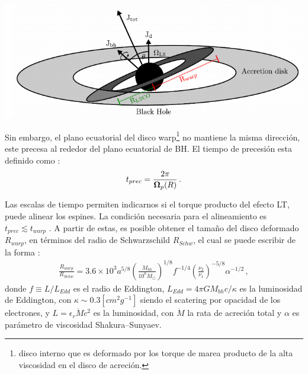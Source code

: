 %
\begin{center}
\includegraphics[scale=.4]{./figures/4_Modelo_Spin/Sistema_con_region_warp.png}
\label{fig: sistema con zona warp}
\end{center}
%
Sin embargo, el plano ecuatorial del disco warp\footnote{disco interno que es deformado por los torque de marea producto de la alta viscosidad en el disco de acreción.} no mantiene la misma dirección, este precesa al rededor del plano ecuatorial de BH. El tiempo de precesión esta definido como \cite{fanidakis2011}:
%
\begin{align}
    t_{prec}= \frac{2\pi}{{\bf{\Omega}}_p(R)}\,.
\end{align}

Las escalas de tiempo permiten indicarnos si el torque producto del efecto LT, puede alinear los espines. La condición necesaria para el alineamiento es $t_{prec}\lesssim t_{warp}$ \cite{natarajan1999}. A partir de estas, es posible obtener el tamaño del disco deformado $R_{warp}$, en términos del radio de Schwarzschild $R_{Schw}$, el cual se puede escribir de la forma \cite{volonteri2007}:
%
\begin{align}
    \frac{R_{warp}}{R_{Schw}}=3.6\times 10^{3}a^{5/8}\left(\frac{M_{bh}}{10^{8}M_{\odot}} \right)^{1/8}f^{-1/4}\left(\frac{\nu_{2}}{\nu_{1}} \right)^{-5/8}\alpha^{-1/2}\,,
\end{align}
%
donde $f\equiv L/L_{Edd}$ es el radio de Eddington, $L_{Edd}=4\pi GM_{bh}c/\kappa$ es  la luminosidad de Eddington, con $\kappa\sim 0.3 [cm^{2}g^{-1}]$ siendo el scatering por opacidad de los electrones, y $L=\epsilon_{r}\dot{M}c^{2}$ es la luminosidad, con $\dot{M}$ la rata de acreción total y $\alpha$ es parámetro de viscosidad Shakura–Sunyaev.

